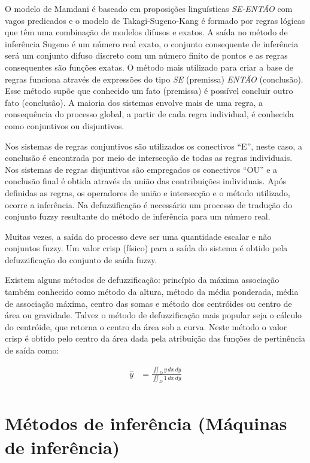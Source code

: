 \documentclass{article}
\begin{document}
O modelo de Mamdani é baseado em proposições linguísticas
\emph{SE-ENTÃO} com vagos predicados e o modelo de
Takagi-Sugeno-Kang é formado por regras lógicas que têm uma
combinação de modelos difusos e exatos. A saída no método de
inferência Sugeno é um número real exato, o conjunto consequente
de inferência será um conjunto difuso discreto com um número
finito de pontos e as regras consequentes são funções exatas. O
método mais utilizado para criar a base de regras funciona
através de expressões do tipo \emph{SE} (premissa) \emph{ENTÃO}
(conclusão). Esse método supõe que conhecido um fato (premissa)
é possível concluir outro fato (conclusão). A maioria dos
sistemas envolve mais de uma regra, a consequência do processo
global, a partir de cada regra individual, é conhecida como
conjuntivos ou disjuntivos.

Nos sistemas de regras conjuntivos são utilizados os conectivos
``E'', neste caso, a conclusão é encontrada por meio de
intersecção de todas as regras individuais. Nos sistemas de
regras disjuntivos são empregados os conectivos ``OU'' e a
conclusão final é obtida através da união das contribuições
individuais. Após definidas as regras, os operadores de união e
intersecção e o método utilizado, ocorre a inferência. Na
defuzzificação é necessário um processo de tradução do conjunto
fuzzy resultante do método de inferência para um número real.

Muitas vezes, a saída do processo deve ser uma quantidade
escalar e não conjuntos fuzzy. Um valor crisp (físico) para a
saída do sistema é obtido pela defuzzificação do conjunto de
saída fuzzy.

Existem alguns métodos de defuzzificação: princípio da máxima
associação também conhecido como método da altura, método da
média ponderada, média de associação máxima, centro das somas e
método dos centróides ou centro de área ou gravidade. Talvez o
método de defuzzificação mais popular seja o cálculo do
centróide, que retorna o centro da área sob a curva. Neste
método o valor crisp é obtido pelo centro da área dada pela
atribuição das funções de pertinência de saída como:

\begin{equation} \label{eq1}
\begin{split}
    \hat{y} & = \frac{\iint_D y \,dx\,dy}{\iint_D 1 \,dx\,dy} \\
\end{split}
\end{equation}


\section{Métodos de inferência (Máquinas de inferência)}
\end{document}
